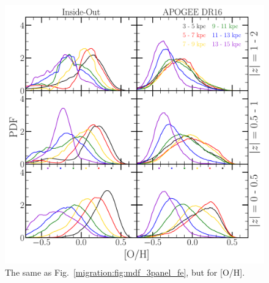 \begin{figure} 
\centering 
\includegraphics[scale = 0.45]{mdf_3panel_o.pdf} 
\caption{The same as Fig.~\ref{migration:fig:mdf_3panel_fe}, but for [O/H]. } 
\label{migration:fig:mdf_3panel_o} 
\end{figure} 

